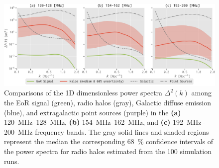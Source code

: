 \documentclass[modern]{aastex62}
\begin{document}
\begin{figure}
  \centering
  \includegraphics[width=\textwidth]{ps1d-3bands}
  \caption{\label{fig:ps1d-3bands}%
    Comparisons of the 1D dimensionless power spectra $\Delta^2(k)$
    among the EoR signal (green), radio halos (gray), Galactic diffuse
    emission (blue), and extragalactic point sources (purple) in the
    \textbf{(a)} \SIrange{120}{128}{\MHz},
    \textbf{(b)} \SIrange{154}{162}{\MHz}, and
    \textbf{(c)} \SIrange{192}{200}{\MHz} frequency bands.
    The gray solid lines and shaded regions represent the median the
    corresponding \SI{68}{\percent} confidence intervals of the power
    spectra for radio halos estimated from the 100 simulation runs.
  }
\end{figure}
\end{document}
